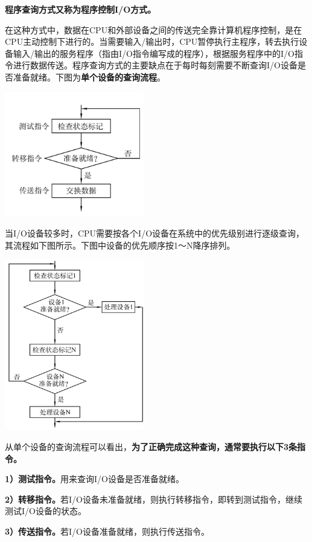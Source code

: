 \textbf{程序查询方式又称为程序控制I/O方式。}

在这种方式中，数据在CPU和外部设备之间的传送完全靠计算机程序控制，是在CPU主动控制下进行的。当需要输入/输出时，CPU暂停执行主程序，转去执行设备输入/输出的服务程序（指由I/O指令编写成的程序），根据服务程序中的I/O指令进行数据传送。{程序查询方式的主要缺点}在于每时每刻需要不断查询I/O设备是否准备就绪。{下图为}\textbf{单个设备的查询流程}{。}

\includegraphics[width=2.39583in,height=2.14583in]{png-jpeg-pics/69E314883DA056493F5A812F4EB1FE08.png}

当I/O设备较多时，CPU需要按各个I/O设备在系统中的优先级别进行逐级查询，其流程如下图所示。下图中设备的优先顺序按1～N降序排列。

\includegraphics[width=2.39583in,height=2.92708in]{png-jpeg-pics/93AB1CF14106288AE4A3CCD1E3247365.png}

从单个设备的查询流程可以看出，{\textbf{为了正确完成这种查询，通常要执行以下3条指令。}}

\textbf{1）测试指令。}用来查询I/O设备是否准备就绪。

\textbf{2）转移指令。}若I/O设备未准备就绪，则执行转移指令，即转到测试指令，继续测试I/O设备的状态。

\textbf{3）传送指令。}若I/O设备准备就绪，则执行传送指令。\\
